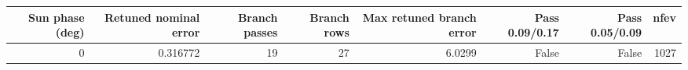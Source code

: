 \begin{tabular}{rrrrrrrr}
\toprule
Sun phase (deg) & Retuned nominal error & Branch passes & Branch rows & Max retuned branch error & Pass 0.09/0.17 & Pass 0.05/0.09 & nfev \\
\midrule
0 & 0.316772 & 19 & 27 & 6.0299 & False & False & 1027 \\
\bottomrule
\end{tabular}
